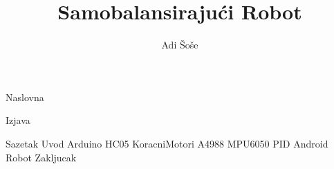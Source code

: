 \documentclass[12pt,a4paper]{article}
\title{Samobalansirajući Robot}
\author{Adi Šoše}
\begin{document}
\selectfont


{Naslovna}

{Izjava}
\pagebreak

\setcounter{page}{1}
\renewcommand*\contentsname{Sadržaj}
\tableofcontents

\pagebreak
{}



\linespread{1.3}

{Sazetak}
{Uvod}
{Arduino}
{HC05}
{KoracniMotori}
{A4988}
{MPU6050}
{PID}
{Android}
{Robot}
{Zakljucak}
\end{document}
